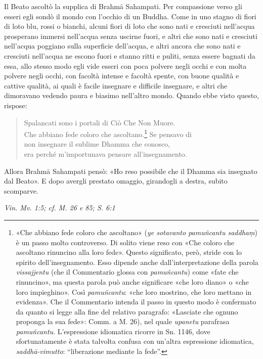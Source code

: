 Il Beato ascoltò la supplica di Brahmā Sahampati. Per compassione verso
gli esseri egli sondò il mondo con l’occhio di un Buddha. Come in uno
stagno di fiori di loto blu, rossi o bianchi, alcuni fiori di loto che
sono nati e cresciuti nell’acqua prosperano immersi nell’acqua senza
uscirne fuori, e altri che sono nati e cresciuti nell’acqua poggiano
sulla superficie dell’acqua, e altri ancora che sono nati e cresciuti
nell’acqua ne escono fuori e stanno ritti e puliti, senza essere bagnati
da essa, allo stesso modo egli vide esseri con poca polvere negli occhi
e con molta polvere negli occhi, con facoltà intense e facoltà spente,
con buone qualità e cattive qualità, ai quali è facile insegnare e
difficile insegnare, e altri che dimoravano vedendo paura e biasimo
nell’altro mondo. Quando ebbe visto questo, rispose:


\begin{quote}
Spalancati sono i portali di Ciò Che Non Muore. \\
Che abbiano fede coloro che ascoltano.\footnote{«Che abbiano fede coloro che ascoltano» (\emph{ye sotavanto pamuñcantu saddhaṃ}) è un passo molto controverso. Di solito viene reso con «Che coloro che ascoltano rinuncino alla loro fede». Questo significato, però, stride con lo spirito dell’insegnamento. Esso dipende anche dall’interpretazione della parola \emph{vissajjentu} (che il Commentario glossa con \emph{pamuñcantu}) come «fate che rinuncino», ma questa parola può anche significare «che loro diano» o «che loro impieghino». Così \emph{pamuñcantu}: «che loro mostrino, che loro mettano in evidenza». Che il Commentario intenda il passo in questo modo è confermato da quanto si legge alla fine del relativo paragrafo: «Lasciate che ognuno proponga la sua fede»: Comm. a M. 26), nel quale \emph{upanetu} parafrasa \emph{pamuñcantu}. L’espressione idiomatica ricorre in Sn. 1146, dove sfortunatamente è stata talvolta confusa con un’altra espressione idiomatica, \emph{saddhā-vimutto}: “liberazione mediante la fede”.} Se pensavo di \\
non insegnare il sublime Dhamma che conosco, \\
era perché m’importunava pensare all’insegnamento.
\end{quote}

Allora Brahmā Sahampati pensò: «Ho reso possibile che il Dhamma sia
insegnato dal Beato». E dopo avergli prestato omaggio, girandogli a
destra, subito scomparve.


\emph{Vin. Mv. 1:5; cf. M. 26 e 85; S. 6:1}


